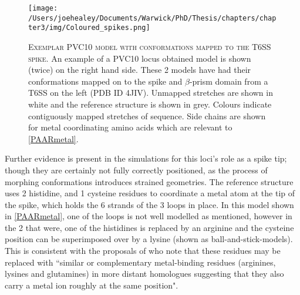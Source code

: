 \begin{figure}[h!]
\centering
\texttt{[image: /Users/joehealey/Documents/Warwick/PhD/Thesis/chapters/chapter3/img/Coloured\_spikes.png]}
\captionsetup{singlelinecheck=off, justification=justified, font=footnotesize, aboveskip=10pt}
\caption[A putative conformation of spike tip proteins]{\textsc{\normalsize Exemplar PVC10 model with conformations mapped to the T6SS spike.}\vspace{0.1cm} \newline An example of a PVC10 locus obtained model is shown (twice) on the right hand side. These 2 models have had their conformations mapped on to the spike and $\beta$-prism domain from a T6SS on the left (PDB ID 4JIV). Unmapped stretches are shown in white and the reference structure is shown in grey. Colours indicate contiguously mapped stretches of sequence. Side chains are shown for metal coordinating amino acids which are relevant to \vref{PAARmetal}.}  
	\label{PAAR}
\end{figure}


Further evidence is present in the simulations for this loci's role as a spike tip; though they are certainly not fully correctly positioned, as the process of morphing conformations introduces strained geometries. The reference structure uses 2 histidine, and 1 cysteine residues to coordinate a metal atom at the tip of the spike, which holds the 6 strands of the 3 loops in place. In this model shown in \vref{PAARmetal}, one of the loops is not well modelled as mentioned, however in the 2 that were, one of the histidines is replaced by an arginine and the cysteine position can be superimposed over by a lysine (shown as ball-and-stick-models). This is consistent with the proposals of \cite{Shneider2013} who note that these residues may be replaced with ``similar or complementary metal-binding residues (arginines, lysines and glutamines) in more distant homologues suggesting that they also carry a metal ion roughly at the same position".

